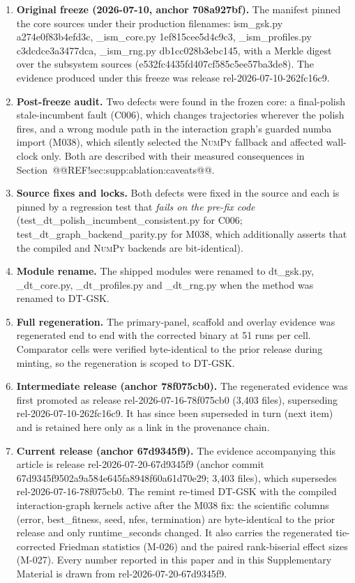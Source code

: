 \documentclass[10pt,a4paper]{article}
\newcommand{\dtgsk}{DT-GSK}
\begin{document}
\begin{enumerate}\itemsep2pt
\item \textbf{Original freeze (2026-07-10, anchor 708a927bf).}  The
  manifest pinned the core sources under their production filenames:
  ism\_gsk.py a274e0f83b4efd3c,
  \_ism\_core.py 1ef815cee5d4c9c3,
  \_ism\_profiles.py c3dcdce3a3477dca,
  \_ism\_rng.py db1cc028b3ebc145, with a Merkle digest over
  the subsystem sources (e532fc4435fd407cf585c5ee57ba3de8).  The evidence
  produced under this freeze was release rel-2026-07-10-262fc16c9.
\item \textbf{Post-freeze audit.}  Two defects were found in the frozen core: a
  final-polish stale-incumbent fault (C006), which changes trajectories wherever
  the polish fires, and a wrong module path in the interaction graph's guarded
  numba import (M038), which silently selected the \textsc{NumPy}
  fallback and affected wall-clock only.  Both are described with their measured
  consequences in Section~@@REF!sec:supp:ablation:caveats@@.
\item \textbf{Source fixes and locks.}  Both defects were fixed in the source and
  each is pinned by a regression test that \emph{fails on the pre-fix code}
  (test\_dt\_polish\_incumbent\_consistent.py for C006;
  test\_dt\_graph\_backend\_parity.py for M038, which additionally
  asserts that the compiled and \textsc{NumPy} backends are bit-identical).
\item \textbf{Module rename.}  The shipped modules were renamed to
  dt\_gsk.py, \_dt\_core.py, \_dt\_profiles.py and
  \_dt\_rng.py when the method was renamed to \dtgsk{}.
\item \textbf{Full regeneration.}  The primary-panel, scaffold and overlay
  evidence was regenerated end to end with the corrected binary at 51 runs per
  cell.  Comparator cells were verified byte-identical to the prior release
  during minting, so the regeneration is scoped to \dtgsk{}.
\item \textbf{Intermediate release (anchor 78f075cb0).}  The regenerated
  evidence was first promoted as release rel-2026-07-16-78f075cb0
  (3{,}403 files), superseding rel-2026-07-10-262fc16c9.  It has since
  been superseded in turn (next item) and is retained here only as a link in the
  provenance chain.
\item \textbf{Current release (anchor 67d9345f9).}  The evidence
  accompanying this article is release rel-2026-07-20-67d9345f9 (anchor
  commit 67d9345f9502a9a584e645fa8948f60a61d70e29; 3{,}403 files), which
  supersedes rel-2026-07-16-78f075cb0.  The remint re-timed \dtgsk{} with
  the compiled interaction-graph kernels active after the M038 fix: the scientific
  columns (error, best\_fitness, seed, nfes,
  termination) are byte-identical to the prior release and only
  runtime\_seconds changed.  It also carries the regenerated
  tie-corrected Friedman statistics (M-026) and the paired rank-biserial effect
  sizes (M-027).  Every number reported in this paper and in this Supplementary
  Material is drawn from rel-2026-07-20-67d9345f9.
\end{enumerate}
\end{document}
